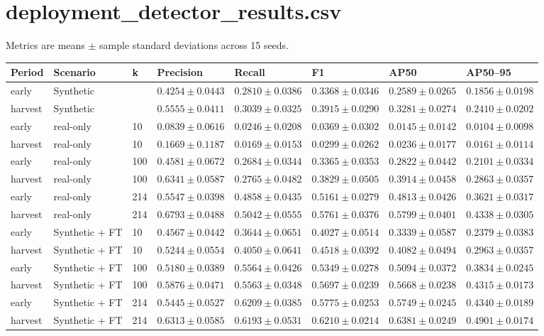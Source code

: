 \documentclass{article}
\begin{document}
\section*{deployment\_detector\_results.csv}
Metrics are means $\pm$ sample standard deviations across 15 seeds.\par\medskip
\begin{lrbox}{\resulttable}\begin{tabular}{llllllll}
\toprule
Period & Scenario & k & Precision & Recall & F1 & AP50 & AP50--95 \\
\midrule
early & Synthetic &  & $0.4254 \pm 0.0443$ & $0.2810 \pm 0.0386$ & $0.3368 \pm 0.0346$ & $0.2589 \pm 0.0265$ & $0.1856 \pm 0.0198$ \\
harvest & Synthetic &  & $0.5555 \pm 0.0411$ & $0.3039 \pm 0.0325$ & $0.3915 \pm 0.0290$ & $0.3281 \pm 0.0274$ & $0.2410 \pm 0.0202$ \\
early & real-only & 10 & $0.0839 \pm 0.0616$ & $0.0246 \pm 0.0208$ & $0.0369 \pm 0.0302$ & $0.0145 \pm 0.0142$ & $0.0104 \pm 0.0098$ \\
harvest & real-only & 10 & $0.1669 \pm 0.1187$ & $0.0169 \pm 0.0153$ & $0.0299 \pm 0.0262$ & $0.0236 \pm 0.0177$ & $0.0161 \pm 0.0114$ \\
early & real-only & 100 & $0.4581 \pm 0.0672$ & $0.2684 \pm 0.0344$ & $0.3365 \pm 0.0353$ & $0.2822 \pm 0.0442$ & $0.2101 \pm 0.0334$ \\
harvest & real-only & 100 & $0.6341 \pm 0.0587$ & $0.2765 \pm 0.0482$ & $0.3829 \pm 0.0505$ & $0.3914 \pm 0.0458$ & $0.2863 \pm 0.0357$ \\
early & real-only & 214 & $0.5547 \pm 0.0398$ & $0.4858 \pm 0.0435$ & $0.5161 \pm 0.0279$ & $0.4813 \pm 0.0426$ & $0.3621 \pm 0.0317$ \\
harvest & real-only & 214 & $0.6793 \pm 0.0488$ & $0.5042 \pm 0.0555$ & $0.5761 \pm 0.0376$ & $0.5799 \pm 0.0401$ & $0.4338 \pm 0.0305$ \\
early & Synthetic + FT & 10 & $0.4567 \pm 0.0442$ & $0.3644 \pm 0.0651$ & $0.4027 \pm 0.0514$ & $0.3339 \pm 0.0587$ & $0.2379 \pm 0.0383$ \\
harvest & Synthetic + FT & 10 & $0.5244 \pm 0.0554$ & $0.4050 \pm 0.0641$ & $0.4518 \pm 0.0392$ & $0.4082 \pm 0.0494$ & $0.2963 \pm 0.0357$ \\
early & Synthetic + FT & 100 & $0.5180 \pm 0.0389$ & $0.5564 \pm 0.0426$ & $0.5349 \pm 0.0278$ & $0.5094 \pm 0.0372$ & $0.3834 \pm 0.0245$ \\
harvest & Synthetic + FT & 100 & $0.5876 \pm 0.0471$ & $0.5563 \pm 0.0348$ & $0.5697 \pm 0.0239$ & $0.5668 \pm 0.0238$ & $0.4315 \pm 0.0173$ \\
early & Synthetic + FT & 214 & $0.5445 \pm 0.0527$ & $0.6209 \pm 0.0385$ & $0.5775 \pm 0.0253$ & $0.5749 \pm 0.0245$ & $0.4340 \pm 0.0189$ \\
harvest & Synthetic + FT & 214 & $0.6313 \pm 0.0585$ & $0.6193 \pm 0.0531$ & $0.6210 \pm 0.0214$ & $0.6381 \pm 0.0249$ & $0.4901 \pm 0.0174$ \\
\bottomrule
\end{tabular}\end{lrbox}
\noindent\ifdim\wd\resulttable>\linewidth\resizebox{.99\linewidth}{!}{\usebox{\resulttable}}\else\usebox{\resulttable}\fi
\clearpage
\end{document}
